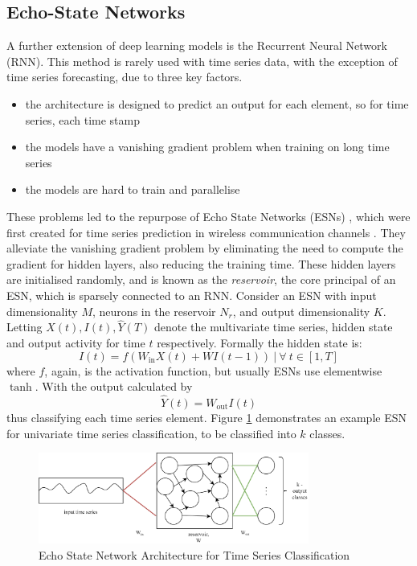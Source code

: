\documentclass[journal]{IEEEtran}
\begin{document}
\subsection{Echo-State Networks}
A further extension of deep learning models is the Recurrent Neural Network (RNN). This method is rarely used with time series data, with the exception of time series forecasting, due to three key factors.
\begin{itemize}
    \item the architecture is designed to predict an output for each element, so for time series, each time stamp \cite{langkvist2014}
    \item the models have a vanishing gradient problem when training on long time series \cite{pascanu2012}
    \item the models are hard to train and parallelise \cite{pascanu2012}
\end{itemize}
These problems led to the repurpose of Echo State Networks (ESNs) \cite{gallicchio2017}, which were first created for time series prediction in wireless communication channels \cite{jaeger2004}. They alleviate the vanishing gradient problem by eliminating the need to compute the gradient for hidden layers, also reducing the training time. These hidden layers are initialised randomly, and is known as the \textit{reservoir}, the core principal of an ESN, which is sparsely connected to an RNN. Consider an ESN with input dimensionality $M$, neurons in the reservoir $N_r$, and output dimensionality $K$. Letting $X(t), I(t), \hat{Y}(T)$ denote the multivariate time series, hidden state and output activity for time $t$ respectively. Formally the hidden state is:
\begin{equation}\label{eq:esn}
    I(t) = f(W_{\text{in}}X(t) + W I(t-1)) \ \big\rvert \ \forall \ t \in [1, T]
\end{equation}
where $f$, again, is the activation function, but usually ESNs use elementwise $\tanh$. With the output calculated by
\begin{equation}\label{eq:esn-output}
    \hat{Y}(t) = W_{\text{out}}I(t)
\end{equation}
thus classifying each time series element. Figure \ref{fig:esn-layers} demonstrates an example ESN for univariate time series classification, to be classified into $k$ classes.

\begin{figure}[h]
    \centering
    \includegraphics[width=3.5in]{assets/ESN_example.png}
    
    \caption{Echo State Network Architecture for Time Series Classification}
    \label{fig:esn-layers}
\end{figure}
\end{document}
